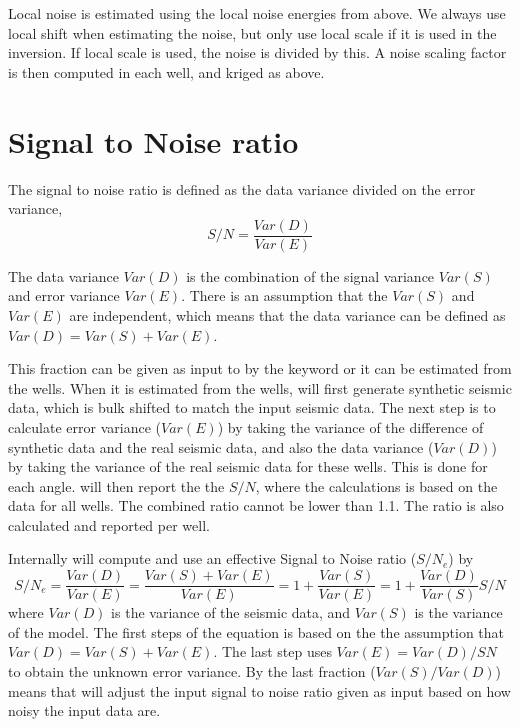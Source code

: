 Local noise is estimated using the local noise energies from above. We always use local shift when estimating the noise, but only use local scale if it is used in the inversion. If local scale is used, the noise is divided by this. A noise scaling factor is then computed in each well, and kriged as above.

\section{Signal to Noise ratio}
\label{sec:snratio}

The signal to noise ratio is defined as the data variance divided on the error variance, 
\begin{equation}
S/N = \frac{Var(D)}{Var(E)}
\end{equation}

The data variance $Var(D)$ is the combination of the signal variance $Var(S)$ and error variance $Var(E)$. There is an assumption that the $Var(S)$ and $Var(E)$ are independent, which means that the data variance can be defined as $Var(D) = Var(S) + Var(E)$.

This fraction can be given as input to \crava by the  keyword or it can be estimated from the wells. When it is estimated from the wells, \crava will first generate synthetic seismic data, which is bulk shifted to match the input seismic data. The next step is to calculate error variance ($Var(E)$) by taking the variance of the difference of synthetic data and the real seismic data, and also the data variance ($Var(D)$) by taking the variance of the real seismic data for these wells. This is done for each angle. \crava will then report the the $S/N$, where the calculations is based on the data for all wells. The combined ratio cannot be lower than 1.1. The ratio is also calculated and reported per well. 

Internally \crava will compute and use an effective Signal to Noise ratio ($S/N_{e}$) by
\begin{equation}
S/N_{e} = \frac{Var(D)}{Var(E)} = \frac{Var(S) + Var(E)}{Var(E)} = 1 + \frac{Var(S)}{Var(E)} = 1 + \frac{Var(D)}{Var(S)}S/N
\end{equation}
where $Var(D)$ is the variance of the seismic data, and $Var(S)$ is the variance of the model. The first steps of the equation is based on the the assumption that $Var(D) = Var(S) + Var(E)$. The last step uses $Var(E) = Var(D)/SN$ to obtain the unknown error variance. By the last fraction ($Var(S)/Var(D)$) means that \crava will adjust the input signal to noise ratio given as input based on how noisy the input data are.

